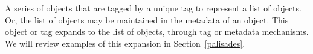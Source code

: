 A series of objects that are tagged by a unique tag to represent a list of objects. Or, the list of objects may be maintained in the metadata of an object. This object or tag expands to the list of objects, through tag or metadata mechanisms. We will review examples of this expansion in Section~\ref{palisades}.